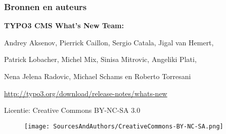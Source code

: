 \begin{frame}[fragile]
	\frametitle{Bronnen en auteurs}

	\vspace{-0.6cm}

	\centerline{\textbf{TYPO3 CMS What's New Team:}}

	\begin{center}
		\centerline{Andrey Aksenov, Pierrick Caillon, Sergio Catala, Jigal van Hemert,}
		\centerline{Patrick Lobacher, Michel Mix, Sinisa Mitrovic, Angeliki Plati,}
		\centerline{Nena Jelena Radovic, Michael Schams en Roberto Torresani}
	\end{center}

	\vspace{0.4cm}

	\smaller\begin{center}\url{http://typo3.org/download/release-notes/whats-new}\end{center}\normalsize

	\vspace{0.8cm}

	\smaller\begin{center}Licentie: Creative Commons BY-NC-SA 3.0\end{center}\normalsize
	\begin{figure}\vspace*{-0.4cm}
		\texttt{[image: SourcesAndAuthors/CreativeCommons-BY-NC-SA.png]}
	\end{figure}

\end{frame}

